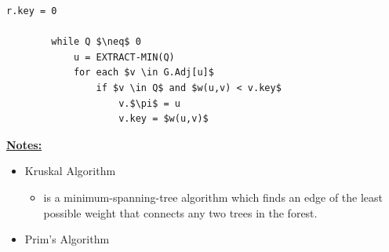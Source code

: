 \documentclass[12pt]{article}
\begin{document}
\begin{enumerate}[1.]
\begin{lstlisting}[mathescape=true]
        r.key = 0

        while Q $\neq$ 0
            u = EXTRACT-MIN(Q)
            for each $v \in G.Adj[u]$
                if $v \in Q$ and $w(u,v) < v.key$
                    v.$\pi$ = u
                    v.key = $w(u,v)$
    \end{lstlisting}


    \bigskip

    \underline{\textbf{Notes:}}

    \bigskip

    \begin{itemize}
        \item Kruskal Algorithm

        \begin{itemize}
            \item is a minimum-spanning-tree algorithm which finds an edge of the least possible weight that connects
            any two trees in the forest.
        \end{itemize}

        \item Prim's Algorithm


\end{itemize}
\end{enumerate}
\end{document}
